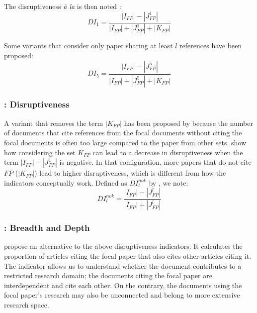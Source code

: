 The disruptiveness \textit{à la} \cite{wu2019large} is then noted :
$$DI_1 = \frac{|I_{FP}|-|J_{FP}^1|}{|I_{FP}|+|J_{FP}^1|+|K_{FP}|}$$

Some variants that consider only paper sharing at least $l$ references have been proposed:
$$DI_5 = \frac{|I_{FP}|-|J_{FP}^5|}{|I_{FP}|+|J_{FP}^5|+|K_{FP}|}$$

\begin{figure}[h!]
  \centering
  
  \caption[\cite{wu2019large,bornmann1911disruption} ]{\cite{wu2019large,bornmann1911disruption} \footnotemark}
\end{figure} 


\subsubsection{\cite{bornmann1911disruption}: Disruptiveness}

A variant that removes the term $|K_{FP}|$ has been proposed by \cite{wu2019solo} because the number of documents that cite references from the focal documents without citing the focal documents is often too large compared to the paper from other sets. \cite{wu_wu_2019} show how considering the set $K_{FP}$ can lead to a decrease in disruptiveness when the term $|I_{FP}|-|J_{FP}^1|$ is negative. In that configuration, more papers that do not cite $FP$ ($|K_{FP}|$) lead to higher disruptiveness, which is different from how the indicators conceptually work.
Defined as $DI_l^{no k}$ by \cite{bornmann1911disruption}, we note:
$$ DI_l^{no k} =  \frac{|I_{FP}|-|J_{FP}^l|}{|I_{FP}|+|J_{FP}^l|} $$



\subsubsection{\cite{bu2019multi}: Breadth and Depth}

\cite{bu2019multi} propose an alternative to the above disruptiveness indicators. It calculates the proportion of articles citing the focal paper that also cites other articles citing it. The indicator allows us to understand whether the document contributes to a restricted research domain; the documents citing the focal paper are interdependent and cite each other. On the contrary, the documents using the focal paper's research may also be unconnected and belong to more extensive research space.

